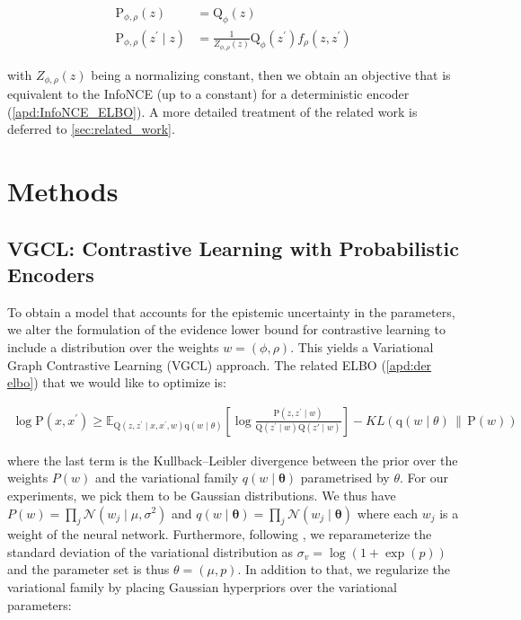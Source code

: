 \documentclass[tablecaption=bottom,wcp]{jmlr} %
\begin{document}
\begin{equation}
\label{eqn:4}
\begin{aligned}
\mathrm{P}_{\phi,\rho}(z) & =\mathrm{Q}_\phi(z) \\
\mathrm{P}_{\phi, \rho}\left(z^{\prime} \mid z\right) & =\frac{1}{Z_{\phi, \rho}(z)} \mathrm{Q}_\phi\left(z^{\prime}\right) f_\rho\left(z, z^{\prime}\right)
\end{aligned}
\end{equation}

with $Z_{ \phi,\rho}(z)$ being a normalizing constant, then we obtain an objective that is equivalent to the InfoNCE (up to a constant) for a deterministic encoder (\cref{apd:InfoNCE_ELBO}). A more detailed treatment of the related work is deferred to \cref{sec:related_work}.


\section{Methods}


\subsection{VGCL: Contrastive Learning with Probabilistic Encoders}

To obtain a model that accounts for the epistemic uncertainty in the parameters, we alter the formulation of the evidence lower bound for contrastive learning to include a distribution over the weights $w = (\phi,\rho)$. This yields a Variational Graph Contrastive Learning (VGCL) approach. The related ELBO (\cref{apd:der elbo}) that we would like to optimize is:

\begin{align}
\log \mathrm{P}\left(x, x^{\prime}\right)\geq \mathbb{E}_{\mathrm{Q} \left(z, z^{\prime} \mid x,x^{\prime},w \right)\mathrm{q} (w\mid \theta)}\left[ \log \frac{\mathrm{P} \left(z,z^{\prime} \mid w \right)}{\mathrm{Q}\left(z^{\prime}\mid w\right)\mathrm{Q}\left(z' \mid w \right)} \right] - KL(\mathrm{q}(w\mid \theta) \, \| \, \mathrm{P}(w))
\end{align}


where the last term is the Kullback–Leibler divergence between the prior over the weights $P(w)$ and the variational family $q(w\mid \mathbf{\theta})$ parametrised by $\theta$. For our experiments, we pick them to be Gaussian distributions. We thus have $P(w)=\prod_j \mathcal{N}\left(w_j \mid \mu , \sigma^2\right)$ and $q(w\mid \mathbf{\theta} )=\prod_j \mathcal{N}\left(w_j \mid \mathbf{\theta}\right)$ where each $w_{j}$ is a weight of the neural network. Furthermore, following \citet{blundell2015bbb}, we reparameterize the standard deviation of the variational distribution as $\sigma_{v}=\log (1+\exp (p))$ and the parameter set is thus $\theta=(\mu,p)$. In addition to that, we regularize the variational family by placing Gaussian hyperpriors over the variational parameters:
\end{document}
